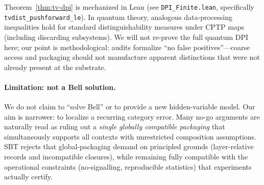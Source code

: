 Theorem~\ref{thm:tv-dpi} is mechanized in Lean (see \texttt{DPI\_Finite.lean}, specifically \texttt{tvdist\_pushforward\_le}).
In quantum theory, analogous data-processing inequalities hold for standard distinguishability measures under CPTP maps (including discarding subsystems).\cite{Lindblad1975EntropyIneq}
We will not re-prove the full quantum DPI here; our point is methodological:
audits formalize ``no false positives''---coarse access and packaging should not manufacture apparent distinctions that were not already present at the substrate.

\paragraph{Limitation: not a Bell solution.}
We do not claim to ``solve Bell'' or to provide a new hidden-variable model.
Our aim is narrower: to localize a recurring category error.
Many no-go arguments are naturally read as ruling out a \emph{single globally compatible packaging} that simultaneously supports all contexts with unrestricted composition assumptions.
SBT rejects that global-packaging demand on principled grounds (layer-relative records and incompatible closures), while remaining fully compatible with the operational constraints (no-signalling, reproducible statistics) that experiments actually certify.
